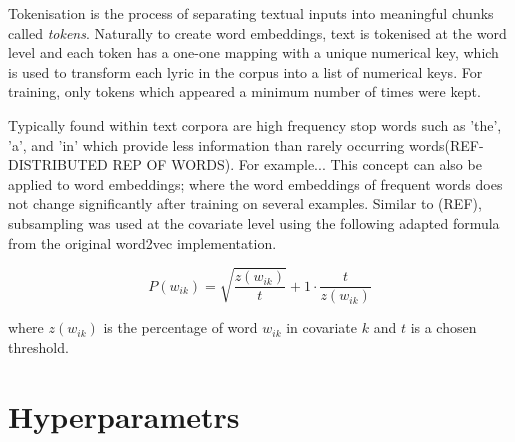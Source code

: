 \noindent
\newline
Tokenisation is the process of separating textual inputs into meaningful chunks called \textit{tokens}. Naturally to create word embeddings, text is tokenised at the word level and each token has a one-one mapping with a unique numerical key, which is used to transform each lyric in the corpus into a list of numerical keys. For training, only tokens which appeared a minimum number of times were kept.
 
\noindent
\newline
Typically found within text corpora are high frequency stop words such as 'the', 'a', and 'in' which provide less information than rarely occurring words(REF-DISTRIBUTED REP OF WORDS). For example... This concept can also be applied to word embeddings; where the word embeddings of frequent words does not change significantly after training on several examples. Similar to (REF), subsampling was used at the covariate level using the following adapted formula from the original word2vec implementation.

\begin{equation}
P(w_{ik}) = \sqrt{\dfrac{z(w_{ik})}{t}} + 1 \cdot \dfrac{t}{z(w_{ik})}
\end{equation}

\noindent
\newline
where \(z(w_{ik})\) is the percentage of word \(w_{ik}\) in covariate \(k\) and \(t\) is a chosen threshold.

\section{Hyperparametrs}

